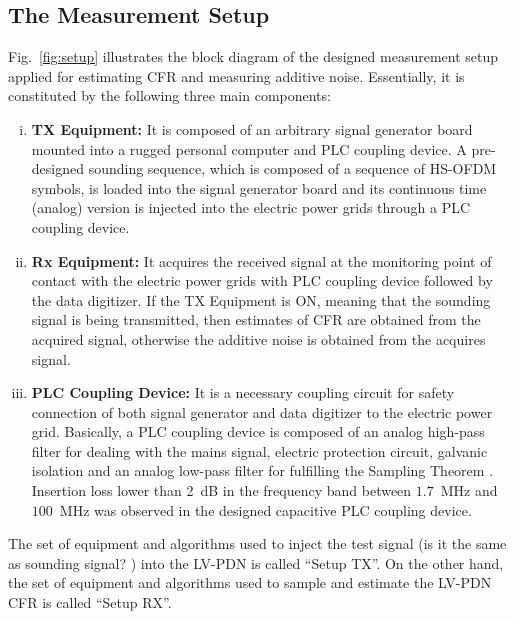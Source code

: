 \documentclass[journal]{IEEEtran}
\begin{document}
\subsection{The Measurement Setup}
\color{blue} Fig.~\ref{fig:setup} illustrates the block diagram of the designed measurement setup applied for estimating \ac{CFR} and measuring additive noise. Essentially, it is constituted by the following three main components: \color{black}
\begin{enumerate}[(i)]
\item \color{blue} {\bf TX Equipment:} \color{black} It is composed of an arbitrary signal generator board mounted into a rugged personal computer and \ac{PLC} coupling device. A pre-designed sounding sequence, which is composed of a sequence of \ac{HS-OFDM} symbols, is loaded into \color{blue} the signal generator board and its continuous time (analog) version is injected into the electric power grids through a \ac{PLC} coupling device.
\item \color{blue} {\bf Rx Equipment:}\color{black} It acquires the received signal at the monitoring point of contact with the electric power grids with \ac{PLC} coupling device followed by the data digitizer. If the TX Equipment is ON, meaning that the sounding signal is being transmitted, then estimates of \ac{CFR} are obtained from the acquired signal, otherwise the additive noise is obtained from the acquires signal.
\item \color{blue} {\bf \ac{PLC} Coupling Device:} It is a necessary coupling circuit for safety connection of both signal generator and data digitizer to the electric power grid. Basically, a \ac{PLC} coupling device is composed of an analog high-pass filter for dealing with the mains signal, electric protection circuit, galvanic isolation and an analog low-pass filter for fulfilling the Sampling Theorem \cite{SilvaCosta2017}. 
Insertion loss lower than 2~dB in the frequency band between $1.7$~MHz and $100$~MHz was observed in the designed capacitive \ac{PLC} coupling device.
\end{enumerate}

The set of equipment and algorithms used to inject the test signal \color{red}(is it the same as sounding signal? )\color{black} into the \ac{LV-PDN} is called \color{blue} ``Setup TX''\color{black}. 
On the other hand, the set of equipment and algorithms used to sample and estimate the \ac{LV-PDN} \ac{CFR} is called \color{blue} ``Setup RX''\color{black}.
\end{document}
